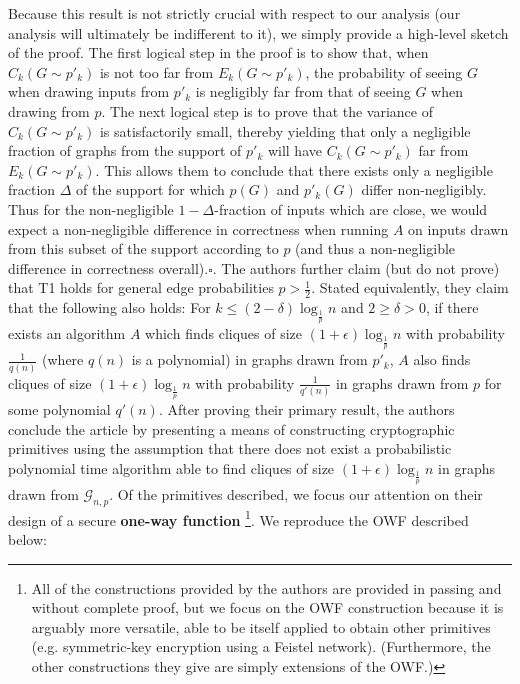 \documentclass{article}
\theoremstyle{definition}
\begin{document}
Because this result is not strictly crucial with respect to our analysis 
(our analysis will ultimately be indifferent to it), we simply provide a high-level sketch of the proof.  The first logical step in the proof is to show that, when $C_k(G\sim p'_k)$ is not too far 
from $E_k(G\sim p'_k)$, the probability of seeing $G$ when drawing inputs from $p'_k$ is negligibly 
far from that of seeing $G$ when drawing from $p$.  The next logical step is to prove that 
the variance of $C_k(G \sim p'_k)$ is satisfactorily small, thereby yielding that only a negligible 
fraction of graphs from the support of $p'_k$ will have $C_k(G\sim p'_k)$ far from 
$E_k(G\sim p'_k)$.  This allows them to conclude that there exists only a negligible 
fraction $\Delta$ of the support for which $p(G)$ and $p'_k(G)$ differ non-negligibly.  
Thus for the non-negligible $1-\Delta$-fraction of inputs which are close, we would expect a non-negligible difference in correctness when running $A$ on inputs drawn from this subset of the 
support according to $p$ (and thus a non-negligible difference in correctness overall).$\square$.
\newline\newline
\noindent The authors further claim (but do not prove) that T1 holds for general 
edge probabilities $p > \frac{1}{2}$.  Stated equivalently, they claim that the following 
also holds:  For $k \leq (2-\delta) \log_{\frac{1}{p}}{n}$ and $2\geq \delta  > 0$,
if there exists an algorithm $A$ which finds cliques of size $(1+\epsilon)\log_{\frac{1}{p}}{n}$ with probability $\frac{1}{q(n)}$ (where $q(n)$ is a polynomial) in graphs drawn from 
$p'_k$, $A$ also finds cliques of size $(1+\epsilon)\log_{\frac{1}{p}}{n}$ with probability 
$\frac{1}{q'(n)}$ in graphs drawn from $p$ for some polynomial $q'(n)$.
\newline\newline
\noindent After proving their primary result, the authors conclude the article by presenting 
a means of constructing cryptographic primitives using the assumption that there does 
not exist a probabilistic polynomial time algorithm able to find 
cliques of size $(1+\epsilon)\log_{\frac{1}{p}}{n}$ in graphs drawn from $\mathcal{G}_{n,p}$.
Of the primitives described, we focus our attention on their design of a secure  
\textbf{one-way function} \footnote{All of the constructions provided by the authors are 
provided in passing and without complete proof, but we focus on the OWF construction 
because it is arguably more versatile, 
able to be itself applied to obtain other primitives (e.g. symmetric-key encryption using a 
Feistel network).
(Furthermore, the other constructions they give are simply extensions of the OWF.)}.  
We reproduce the OWF described below:
\end{document}
